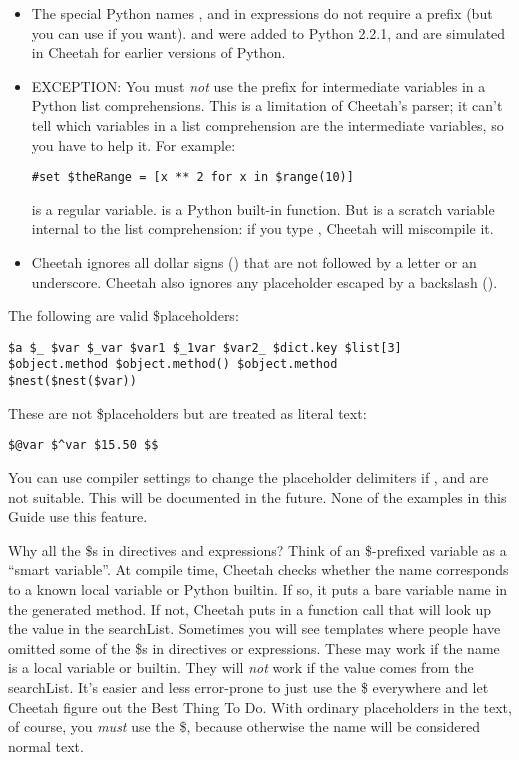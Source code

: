\begin{itemize}
\item The special Python names ,  and  in
     expressions do not require a \code{\$} prefix (but you can use \code{\$}
     if you want).   and  were added to Python 2.2.1, and
     are simulated in Cheetah for earlier versions of Python.

\item EXCEPTION: You must {\em not} use the \code{\$} prefix for intermediate
     variables in a Python list comprehensions.  This is a limitation of
     Cheetah's parser; it can't tell which variables in a list comprehension
     are the intermediate variables, so you have to help it.  For example:
\begin{verbatim}
#set $theRange = [x ** 2 for x in $range(10)]
\end{verbatim}
      is a regular  variable.   is a
     Python built-in function.  But  is a scratch variable internal to
     the list comprehension: if you type , Cheetah will miscompile it.
\item Cheetah ignores all dollar signs (\code{\$}) that are not followed by a
     letter or an underscore.  Cheetah also ignores any placeholder escaped by a
     backslash ().

\end{itemize} 

The following are valid \$placeholders:
\begin{verbatim}
$a $_ $var $_var $var1 $_1var $var2_ $dict.key $list[3]
$object.method $object.method() $object.method
$nest($nest($var))
\end{verbatim}

These are not \$placeholders but are treated as literal text:
\begin{verbatim}
$@var $^var $15.50 $$
\end{verbatim}

You can use compiler settings to change the placeholder delimiters if
\code{\$}, \code{\{} and \code{\}} are not suitable.  This will be documented
in the future.  None of the examples in this Guide use this feature.

Why all the \$s in directives and expressions?  Think of an \$-prefixed
variable as a ``smart variable''.  At compile time, Cheetah checks whether the
name corresponds to a known local variable or Python builtin.  If so, it puts
a bare variable name in the generated method.  If not, Cheetah puts in a 
function call that will look up the value in the searchList.  Sometimes you
will see templates where people have omitted some of the \$s in directives or
expressions.  These may work if the name is a local variable or builtin.
They will {\em not} work if the value comes from the searchList.  It's easier
and less error-prone to just use the \$ everywhere and let Cheetah figure out
the Best Thing To Do.  With ordinary placeholders in the text, of course, you
{\em must} use the \$, because otherwise the name will be considered normal 
text.

